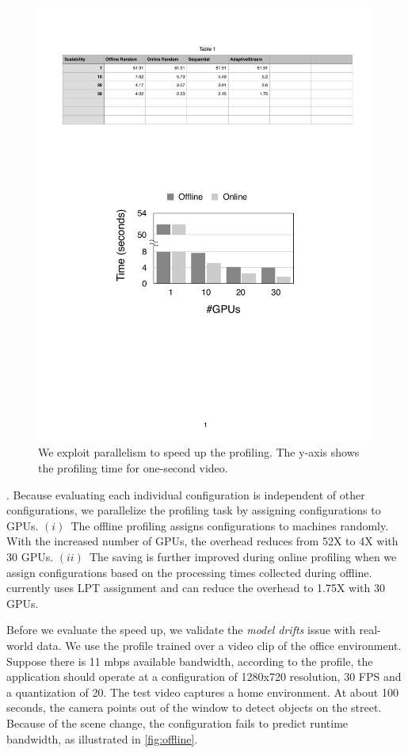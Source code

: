 \begin{figure}
  \centering
  \includegraphics[width=0.9\columnwidth]{figures/parallel.pdf}
  \caption{We exploit parallelism to speed up the profiling. The y-axis shows
    the profiling time for one-second video.}
  \label{fig:parallel}
\end{figure}

. Because
evaluating each individual configuration is independent of other configurations,
we parallelize the profiling task by assigning configurations to GPUs.
$(i)$~The offline profiling assigns configurations to machines randomly. 
With the increased number of GPUs, the overhead reduces from 52X to 4X with 30 GPUs.
$(ii)$~The saving is further improved during online profiling
when we assign configurations based on the processing times collected during offline.
\sysname{} currently uses LPT assignment and can reduce the overhead to 1.75X with 30 GPUs.

 Before we evaluate the speed up, we validate the
\textit{model drifts} issue with real-world data. We use the profile trained
over a video clip of the office environment. Suppose there is 11 mbps available
bandwidth, according to the profile, the application should operate at a
configuration of 1280x720 resolution, 30 FPS and a quantization of 20. The test
video captures a home environment. At about 100 seconds, the camera points out
of the window to detect objects on the street.  Because of the scene change, the
configuration fails to predict runtime bandwidth, as illustrated in
\autoref{fig:offline}.

